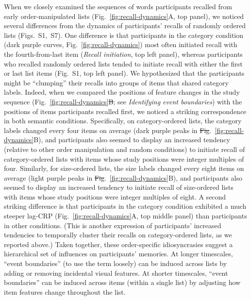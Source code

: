 \documentclass[11pt]{article}
\newcommand{\dynamicsRandom}{S1}
\newcommand{\recallInit}{S7}
\providecommand{\DIFaddtex}[1]{{\protect\color{blue}\uwave{#1}}} %
\providecommand{\DIFdeltex}[1]{{\protect\color{red}\sout{#1}}}                      %
\providecommand{\DIFaddbegin}{} %
\providecommand{\DIFaddend}{} %
\providecommand{\DIFdelbegin}{} %
\providecommand{\DIFdelend}{} %
\providecommand{\DIFadd}[1]{\texorpdfstring{\DIFaddtex{#1}}{#1}} %
\providecommand{\DIFdel}[1]{\texorpdfstring{\DIFdeltex{#1}}{}} %
\newcommand{\DIFscaledelfig}{0.5}
\newlength{\DIFdelgraphicswidth} %
\newlength{\DIFdelgraphicsheight} %
\newcommand{\DIFaddincludegraphics}[2][]{{\color{blue}\fbox{\DIFOincludegraphics[#1]{#2}}}} %
\newcommand{\DIFdelincludegraphics}[2][]{%
\sbox{\DIFdelgraphicsbox}{\DIFOincludegraphics[#1]{#2}}%
\settoboxwidth{\DIFdelgraphicswidth}{\DIFdelgraphicsbox} %
\settoboxtotalheight{\DIFdelgraphicsheight}{\DIFdelgraphicsbox} %
\scalebox{\DIFscaledelfig}{%
\parbox[b]{\DIFdelgraphicswidth}{\usebox{\DIFdelgraphicsbox}\\[-\baselineskip] \rule{\DIFdelgraphicswidth}{0em}}\llap{\resizebox{\DIFdelgraphicswidth}{\DIFdelgraphicsheight}{%
\setlength{\unitlength}{\DIFdelgraphicswidth}%
\begin{picture}(1,1)%
\thicklines\linethickness{2pt} %
{\color[rgb]{1,0,0}\put(0,0){\framebox(1,1){}}}%
{\color[rgb]{1,0,0}\put(0,0){\line( 1,1){1}}}%
{\color[rgb]{1,0,0}\put(0,1){\line(1,-1){1}}}%
\end{picture}%
}\hspace*{3pt}}} %
} %
\DeclareRobustCommand{\DIFaddbegin}{\DIFOaddbegin \let\includegraphics\DIFaddincludegraphics} %
\DeclareRobustCommand{\DIFaddend}{\DIFOaddend \let\includegraphics\DIFOincludegraphics} %
\DeclareRobustCommand{\DIFdelbegin}{\DIFOdelbegin \let\includegraphics\DIFdelincludegraphics} %
\DeclareRobustCommand{\DIFdelend}{\DIFOaddend \let\includegraphics\DIFOincludegraphics} %
\begin{document}
When we closely examined the sequences of words participants recalled from
early order-manipulated lists (Fig.~\ref{fig:recall-dynamics}A, top panel), we
noticed several differences from the dynamics of participants' recalls of
randomly ordered lists (Figs.~\dynamicsRandom,~\recallInit). One difference is
that participants in the category condition (dark purple curves,
Fig.~\ref{fig:recall-dynamics}) most often initiated recall with the
fourth-from-last item (\textit{Recall initiation}, top left panel), whereas
participants who recalled randomly ordered lists tended to initiate recall with
either the first or last list items (Fig.~\dynamicsRandom, top left panel). We
hypothesized that the participants might be ``clumping'' their recalls into
groups of items that shared category labels. Indeed, when we compared the
positions of feature changes in the study sequence
(Fig.~\ref{fig:recall-dynamics}\DIFdelbegin \DIFdel{B}\DIFdelend \DIFaddbegin \DIFadd{C}\DIFaddend ; see \textit{Identifying event boundaries})
with the positions of items participants recalled first, we noticed a striking
correspondence in both semantic conditions. Specifically, on category-ordered
lists, the category labels changed every four items on average (dark purple
peaks in \DIFdelbegin \DIFdel{Fig}\DIFdelend \DIFaddbegin \DIFadd{Figs}\DIFaddend .~\ref{fig:recall-dynamics}B\DIFaddbegin \DIFadd{, C}\DIFaddend ), and participants also seemed to
display an increased tendency (relative to other order manipulation and random
conditions) to initiate recall of category-ordered lists with items whose study
positions were integer multiples of four. Similarly, for size-ordered lists,
the size labels changed every eight items on average (light purple peaks in
\DIFdelbegin \DIFdel{Fig}\DIFdelend \DIFaddbegin \DIFadd{Figs}\DIFaddend .~\ref{fig:recall-dynamics}B\DIFaddbegin \DIFadd{, C}\DIFaddend ), and participants also seemed to display an
increased tendency to initiate recall of size-ordered lists with items whose
study positions were integer multiples of eight. A second striking difference
is that participants in the category condition exhibited a much steeper lag-CRP
(Fig.~\ref{fig:recall-dynamics}A, top middle panel) than participants in other
conditions. (This is another expression of participants' increased tendencies
to temporally cluster their recalls on category-ordered lists, as we reported
above.) Taken together, these order-specific idiosyncrasies suggest a
hierarchical set of influences on participants' memories. At longer timescales,
``event boundaries'' (to use the term loosely) can be induced across lists by
adding or removing incidental visual features. At shorter timescales, ``event
boundaries'' can be induced across items (within a single list) by adjusting
how item features change throughout the list.
\end{document}
